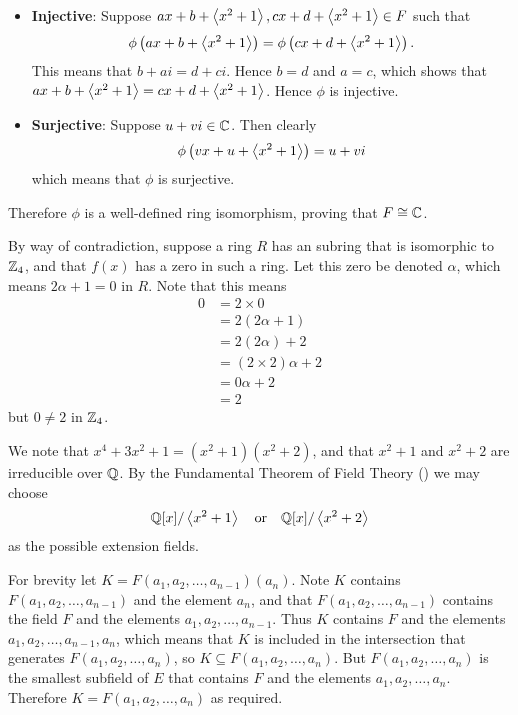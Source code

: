 \begin{questions}
\begin{itemize}
        \item \textbf{Injective}: Suppose $ax + b + \left\langle x^2+1\right\rangle, cx + d + \left\langle x^2+1\right\rangle \in F$ such that
        \[
            \phi\left(ax + b + \left\langle x^2+1\right\rangle\right) = \phi\left(cx + d + \left\langle x^2+1\right\rangle\right).
        \]
        This means that $b + ai = d + ci$. Hence $b = d$ and $a = c$, which shows that $ax + b + \left\langle x^2+1\right\rangle = cx + d + \left\langle x^2+1\right\rangle$. Hence $\phi$ is injective.

        \item \textbf{Surjective}: Suppose $u + vi \in \mathbb{C}$. Then clearly
        \[
            \phi\left(vx + u + \left\langle x^2+1\right\rangle\right) = u + vi
        \]
        which means that $\phi$ is surjective.
    \end{itemize}
    Therefore $\phi$ is a well-defined ring isomorphism, proving that $F \cong \mathbb{C}$.

    \item By way of contradiction, suppose a ring $R$ has an subring that is isomorphic to $\mathbb{Z}_4$, and that $f(x)$ has a zero in such a ring. Let this zero be denoted $\alpha$, which means $2\alpha + 1 = 0$ in $R$. Note that this means
    \begin{align*}
        0 &= 2\times0\\
        &= 2(2\alpha + 1)\\
        &= 2(2\alpha) + 2\\
        &= (2 \times 2)\alpha + 2\\
        &= 0\alpha + 2\\
        &= 2
    \end{align*}
    but $0 \neq 2$ in $\mathbb{Z}_4$.

    \item We note that $x^4 + 3x^2 + 1 = (x^2+1)(x^2+2)$, and that $x^2+1$ and $x^2 + 2$ are irreducible over $\mathbb{Q}$. By the Fundamental Theorem of Field Theory () we may choose
    \[
        \mathbb{Q}[x]/\left\langle x^2+1\right\rangle \quad\text{or}\quad \mathbb{Q}[x]/\left\langle x^2+2\right\rangle
    \]
    as the possible extension fields.

    \item For brevity let $K = F(a_1, a_2, \dots, a_{n-1})(a_n)$. Note $K$ contains $F(a_1, a_2, \dots, a_{n-1})$ and the element $a_n$, and that $F(a_1, a_2, \dots, a_{n-1})$ contains the field $F$ and the elements $a_1, a_2, \dots, a_{n-1}$. Thus $K$ contains $F$ and the elements $a_1, a_2, \dots, a_{n-1}, a_n$, which means that $K$ is included in the intersection that generates $F(a_1, a_2, \dots, a_n)$, so $K \subseteq F(a_1, a_2, \dots, a_n)$. But $F(a_1, a_2, \dots, a_n)$ is the smallest subfield of $E$ that contains $F$ and the elements $a_1, a_2, \dots, a_n$. Therefore $K = F(a_1, a_2, \dots, a_n)$ as required.
    

\end{questions}
